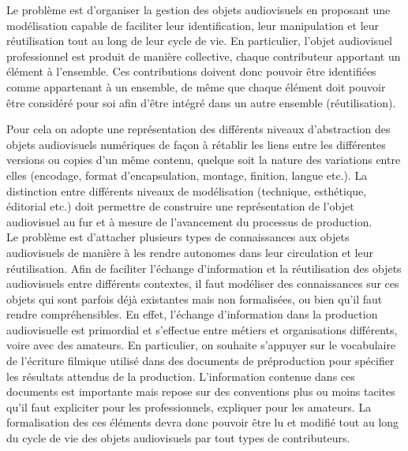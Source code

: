 


 Le problème est d'organiser la gestion des objets audiovisuels en proposant une modélisation capable de faciliter leur identification, leur manipulation et leur réutilisation tout au long de leur cycle de vie. 
En particulier,	l'objet audiovisuel professionnel est produit de manière collective, chaque contributeur apportant un élément à l'ensemble. 
Ces contributions doivent donc pouvoir être identifiées comme appartenant à un ensemble, de même que chaque élément doit pouvoir être considéré pour soi afin d'être intégré dans un autre ensemble (réutilisation).

Pour cela on adopte une représentation des différents niveaux d'abstraction des objets audiovisuels numériques de façon à rétablir les liens entre les différentes versions ou copies d'un même contenu, quelque soit la nature des variations entre elles (encodage, format d'encapsulation, montage, finition, langue etc.).
La distinction entre différents niveaux de modélisation (technique, esthétique, éditorial etc.) doit permettre de construire une représentation de l'objet audiovisuel au fur et à mesure de l'avancement du processus de production.\\


 Le problème est d'attacher plusieurs types de connaissances aux objets audiovisuels de manière à les rendre autonomes dans leur circulation et leur réutilisation. 
Afin de faciliter l'échange d'information et la réutilisation des objets audiovisuels entre différents contextes, il faut modéliser des connaissances sur ces objets qui sont parfois déjà existantes mais non formalisées, ou bien qu'il faut rendre compréhensibles.
En effet, l'échange d'information dans la production audiovisuelle est primordial et s'effectue entre métiers et organisations différents, voire avec des amateurs. 
En particulier, on souhaite s'appuyer sur le vocabulaire de l'écriture filmique utilisé dans des documents de préproduction pour spécifier les résultats attendus de la production.
L'information contenue dans ces documents est importante mais repose sur des conventions plus ou moins tacites qu'il faut expliciter pour les professionnels, expliquer pour les amateurs.
La formalisation des ces éléments devra donc pouvoir être lu et modifié tout au long du cycle de vie des objets audiovisuels par tout types de contributeurs.

